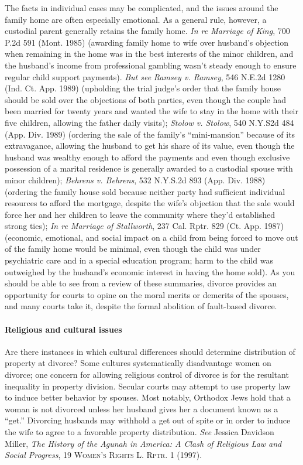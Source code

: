 The facts in individual cases may be complicated, and the issues around the
family home are often especially emotional. As a general rule, however, a
custodial parent generally retains the family home. \emph{In re Marriage of
King}, 700 P.2d 591 (Mont. 1985) (awarding family home to wife over husband's
objection when remaining in the home was in the best interests of the minor
children, and the husband's income from professional gambling wasn't steady
enough to ensure regular child support payments). \textit{But see} \emph{Ramsey
v. Ramsey}, 546 N.E.2d 1280 (Ind. Ct. App. 1989) (upholding the trial judge's
order that the family house should be sold over the objections of both parties,
even though the couple had been married for twenty years and wanted the wife to
stay in the home with their five children, allowing the father daily visits);
\emph{Stolow v. Stolow}, 540 N.Y.S2d 484 (App. Div. 1989) (ordering the sale of
the family's ``mini-mansion'' because of its extravagance, allowing the husband
to get his share of its value, even though the husband was wealthy enough to
afford the payments and even though exclusive possession of a marital residence
is generally awarded to a custodial spouse with minor children); \emph{Behrens
v. Behrens}, 532 N.Y.S.2d 893 (App. Div. 1988) (ordering the family house sold
because neither party had sufficient individual resources to afford the
mortgage, despite the wife's objection that the sale would force her and her
children to leave the community where they'd established strong ties); \emph{In
re Marriage of Stallworth}, 237 Cal. Rptr. 829 (Ct. App. 1987) (economic,
emotional, and social impact on a child from being forced to move out of the
family home would be minimal, even though the child was under psychiatric care
and in a special education program; harm to the child was outweighed by the
husband's economic interest in having the home sold). As you should be able to
see from a review of these summaries, divorce provides an opportunity for
courts to opine on the moral merits or demerits of the spouses, and many courts
take it, despite the formal abolition of fault-based divorce.

\paragraph{Religious and cultural issues} Are there instances in which cultural
differences should determine distribution of property at divorce? Some
cultures systematically disadvantage women on divorce; one concern for allowing
religious control of divorce is for the resultant inequality in property
division. Secular courts may attempt to use property law to induce better
behavior by spouses. Most notably, Orthodox Jews hold that a woman is not
divorced unless her husband gives her a document known as a ``get.'' Divorcing
husbands may withhold a get out of spite or in order to induce the wife to
agree to a favorable property distribution. \textit{See} Jessica Davidson
Miller, \emph{The History of the Agunah in America: A Clash of Religious Law and
Social Progress}, 19 \textsc{Women's Rights L. Rptr.} 1 (1997).

